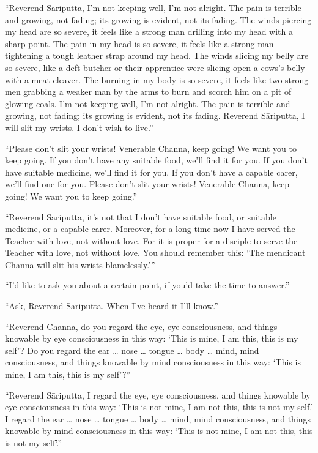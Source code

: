 \documentclass[12pt,openany]{book}%
\begin{document}
“Reverend \textsanskrit{Sāriputta}, I’m not keeping well, I’m not alright. The pain is terrible and growing, not fading; its growing is evident, not its fading. The winds piercing my head are so severe, it feels like a strong man drilling into my head with a sharp point. The pain in my head is so severe, it feels like a strong man tightening a tough leather strap around my head. The winds slicing my belly are so severe, like a deft butcher or their apprentice were slicing open a cows’s belly with a meat cleaver. The burning in my body is so severe, it feels like two strong men grabbing a weaker man by the arms to burn and scorch him on a pit of glowing coals. I’m not keeping well, I’m not alright. The pain is terrible and growing, not fading; its growing is evident, not its fading. Reverend \textsanskrit{Sāriputta}, I will slit my wrists. I don’t wish to live.” 

“Please don’t slit your wrists! Venerable Channa, keep going! We want you to keep going. If you don’t have any suitable food, we’ll find it for you. If you don’t have suitable medicine, we’ll find it for you. If you don’t have a capable carer, we’ll find one for you. Please don’t slit your wrists! Venerable Channa, keep going! We want you to keep going.” 

“Reverend \textsanskrit{Sāriputta}, it’s not that I don’t have suitable food, or suitable medicine, or a capable carer. Moreover, for a long time now I have served the Teacher with love, not without love. For it is proper for a disciple to serve the Teacher with love, not without love. You should remember this: ‘The mendicant Channa will slit his wrists blamelessly.’” 

“I’d like to ask you about a certain point, if you’d take the time to answer.” 

“Ask, Reverend \textsanskrit{Sāriputta}. When I’ve heard it I’ll know.” 

“Reverend Channa, do you regard the eye, eye consciousness, and things knowable by eye consciousness in this way: ‘This is mine, I am this, this is my self’? Do you regard the ear … nose … tongue … body … mind, mind consciousness, and things knowable by mind consciousness in this way: ‘This is mine, I am this, this is my self’?” 

“Reverend \textsanskrit{Sāriputta}, I regard the eye, eye consciousness, and things knowable by eye consciousness in this way: ‘This is not mine, I am not this, this is not my self.’ I regard the ear … nose … tongue … body … mind, mind consciousness, and things knowable by mind consciousness in this way: ‘This is not mine, I am not this, this is not my self’.” 
\end{document}
